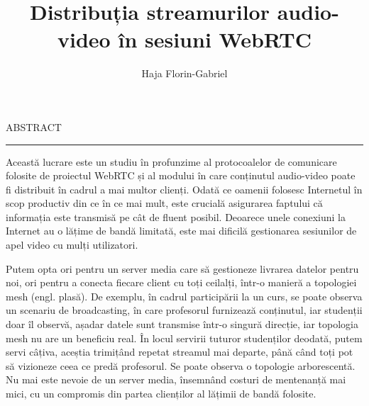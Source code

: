 \documentclass[12pt]{report}
\begin{document}
\title{Distribuția streamurilor audio-video în sesiuni WebRTC}					   
\author{Haja Florin-Gabriel}											
				
\maketitle


\newpage
\thispagestyle{empty}
\mbox{}


\newpage
{} 

\cleardoublepage
ABSTRACT
\vspace{0.5cm}	
\hrule
\vspace{0.5cm}	

\par Această lucrare este un studiu în profunzime al protocoalelor de comunicare folosite de proiectul WebRTC și al modului în care conținutul audio-video poate fi distribuit în cadrul a mai multor clienți. Odată ce oamenii folosesc Internetul în scop productiv din ce în ce mai mult, este crucială asigurarea faptului că informația este transmisă pe cât de fluent posibil. Deoarece unele conexiuni la Internet au o lățime de bandă limitată, este mai dificilă gestionarea sesiunilor de apel video cu mulți utilizatori.
\par Putem opta ori pentru un server media care să gestioneze livrarea datelor pentru noi, ori pentru a conecta fiecare client cu toți ceilalți, într-o manieră a topologiei mesh (engl. plasă). De exemplu, în cadrul participării la un curs, se poate observa un scenariu de broadcasting, în care profesorul furnizează conținutul, iar studenții doar îl observă, așadar datele sunt transmise într-o singură direcție, iar topologia mesh nu are un beneficiu real. În locul servirii tuturor studenților deodată, putem servi câțiva, aceștia trimițând repetat streamul mai departe, până când toți pot să vizioneze ceea ce predă profesorul. Se poate observa o topologie arborescentă. Nu mai este nevoie de un server media, însemnând costuri de mentenanță mai mici, cu un compromis din partea clienților al lățimii de bandă folosite.
\end{document}
